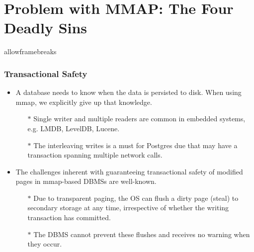 \documentclass[10pt,svgnames,fragile]{beamer}
\begin{document}
\section{Problem with MMAP: The Four Deadly Sins}
\begin{frame}{allowframebreaks}
	\frametitle{Transactional Safety}
	\begin{itemize}
		\item A database needs to know when the data is persisted to disk. When using mmap, we explicitly give up that knowledge.
		\begin{itemize}
			\item[$\ast$] Single writer and multiple readers are common in embedded systems, e.g. LMDB, LevelDB, Lucene.
			\item[$\ast$] The interleaving writes is a must for Postgres due that may have a transaction spanning multiple network calls.
		\end{itemize}
		\item The challenges inherent with guaranteeing transactional safety of modified pages in mmap-based DBMSs are well-known.
		\begin{itemize}
			\item[$\ast$] Due to transparent paging, {\color{red}the OS can flush a dirty page (steal)} to secondary storage {\color{red}at any time}, irrespective of whether the writing transaction has committed. 
			\item[$\ast$] The DBMS cannot prevent these flushes and receives {\color{red}no warning} when they occur.
		\end{itemize}
	\end{itemize}
\end{frame}
\end{document}
